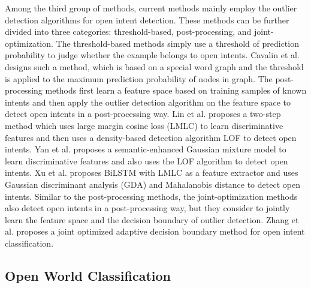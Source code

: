 \documentclass[journal]{IEEEtran}
\begin{document}
Among the third group of methods, current methods mainly employ the outlier detection algorithms for open intent detection.
These methods can be further divided into three categories: threshold-based, post-processing, and joint-optimization.
The threshold-based methods simply use a threshold of prediction probability to judge whether the example belongs to open intents.
Cavalin et al. \cite{DBLP:conf/emnlp/CavalinRAP20} designs such a method, which is based on a special word graph and the threshold is applied to the maximum prediction probability of nodes in graph.
The post-processing methods first learn a feature space based on training samples of known intents and then apply the outlier detection algorithm on the feature space to detect open intents in a post-processing way.
Lin et al. \cite{Lin19} proposes a two-step method which uses large margin cosine loss (LMLC) to learn discriminative features and then uses a density-based detection algorithm LOF to detect open intents.
Yan et al. \cite{Yan20} proposes a semantic-enhanced Gaussian mixture model to learn discriminative features and also uses the LOF algorithm to detect open intents.
Xu et al. \cite{DBLP:conf/coling/XuHYLLX20} proposes BiLSTM with LMLC as a feature extractor and uses Gaussian discriminant analysis (GDA) and Mahalanobis distance to detect open intents.
Similar to the post-processing methods, the joint-optimization methods also detect open intents in a post-processing way, but they consider to jointly learn the feature space and the decision boundary of outlier detection.
Zhang et al. \cite{zhang21} proposes a joint optimized adaptive decision boundary method for open intent classification.

\iffalse
\subsection{Open World Classification}
\end{document}
